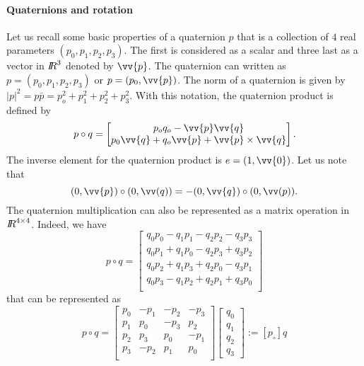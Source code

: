\paragraph{Quaternions and rotation} Let us recall some basic properties of a quaternion $p$ that is a collection of $4$ real parameters $(p_0,p_1,p_2,p_3)$. The first is considered as a scalar and three last as a vector in $\mbox{\rm $I\!\!R$}^3$ denoted by $\vv{p}$. The quaternion can written as $p=(p_0,p_1,p_2,p_3)$ or $p=(p_0,\vv{p})$. The norm of a quaternion is given by $|p|^2=p\bar p = p_o^2+p_1^2+p_2^2+p_3^2$.
 With this notation, the quaternion product is defined by
\begin{equation}
  \label{eq:25}
  p \circ q =
  \begin{bmatrix}
    p_oq_o - \vv{p}\vv{q} \\
    p_0\vv{q}+q_o\vv{p} + \vv{p}\times\vv{q}
  \end{bmatrix}.
\end{equation}
The inverse element for the quaternion product is $e= (1,\vv{0})$. Let us note that 
\begin{equation}
  \label{eq:36}
  (0,\vv{p})\circ (0,\vv(q)) = - (0,\vv{q})\circ (0,\vv(p)).
\end{equation}
The quaternion multiplication can also be represented as a matrix operation in $\mbox{\rm $I\!\!R$}^{4\times4}$. Indeed, we have
\begin{equation}
  \label{eq:26}
  p \circ q  =
  \begin{bmatrix}
    q_0 p_0 -q_1p_1-q_2p_2-q_3p_3\\
    q_0 p_1 +q_1p_0-q_2p_3+q_3p_2\\
    q_0 p_2 +q_1p_3+q_2p_0-q_3p_1\\
    q_0 p_3 -q_1p_2+q_2p_1+q_3p_0\\
  \end{bmatrix}
\end{equation}
that can be represented as
\begin{equation}
  \label{eq:26}
  p \circ q  =
  \begin{bmatrix}
    p_0 & -p_1 & -p_2 & -p_3 \\
    p_1 & p_0 & -p_3 & p_2 \\
    p_2 & p_3 & p_0 & -p_1 \\
    p_3 & -p_2 & p_1 & p_0 \\
  \end{bmatrix}
  \begin{bmatrix}
    q_0\\
    q_1\\
    q_2\\
    q_3
  \end{bmatrix} := [p_\circ]q
\end{equation}
